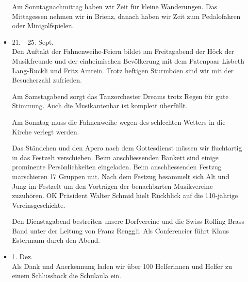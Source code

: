 \begin{history}
\begin{itemize}
        Am Sonntagnachmittag haben wir Zeit für kleine Wanderungen. Das
        Mittagessen nehmen wir in Brienz, danach haben wir Zeit zum Pedalofahren
        oder Minigolfspielen.

        \item[]21. - 25. Sept.\\
        Den Auftakt der Fahnenweihe-Feiern bildet am Freitagabend der Höck der
        Musikfreunde und der einheimischen Bevölkerung mit dem Patenpaar Lisbeth
        Lang-Ruckli und Fritz Amrein. Trotz heftigen Sturmböen sind wir mit der
        Besucherzahl zufrieden.

        Am Samstagabend sorgt das Tanzorchester Dreams trotz Regen für gute
        Stimmung. Auch die Musikantenbar ist komplett überfüllt.

        Am Sonntag muss die Fahnenweihe wegen des schlechten Wetters in die
        Kirche verlegt werden.

        Das Ständchen und den Apero nach dem Gottesdienst
        müssen wir fluchtartig in das Festzelt verschieben. Beim anschliessenden
        Bankett sind einige prominente Persönlichkeiten eingeladen. Beim
        anschliessenden Festzug marschieren 17 Gruppen mit. Nach dem Festzug
        besammelt sich Alt und Jung im Festzelt um den Vorträgen der
        benachbarten Musikvereine zuzuhören. OK Präsident Walter Schmid hielt
        Rückblick auf die 110-jährige Vereinsgeschichte.

        Den Dienstagabend bestreiten unsere Dorfvereine und die Swiss Rolling
        Brass Band unter der Leitung von Franz Renggli. Als Conferencier führt
        Klaus Estermann durch den Abend.

        \item[]1. Dez.\\
        Als Dank und Anerkennung laden wir über 100 Helferinnen und Helfer zu
        einem Schlusshock die Schulaula ein.

    \end{itemize}

\end{history}
